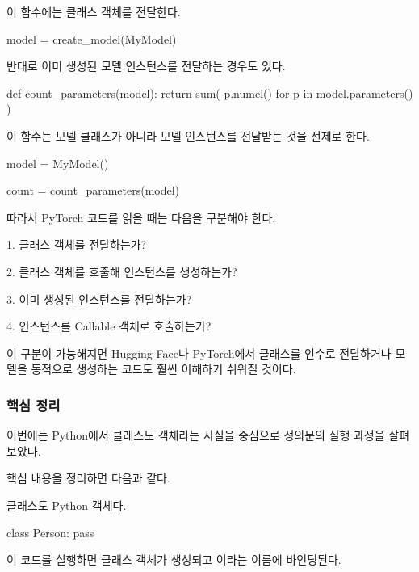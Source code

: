 이 함수에는 클래스 객체를 전달한다.

\begin{dhkcode}
model = create_model(MyModel)
\end{dhkcode}

반대로 이미 생성된 모델 인스턴스를 전달하는 경우도 있다.

\begin{dhkcode}
def count_parameters(model):
    return sum(
        p.numel()
        for p in model.parameters()
    )
\end{dhkcode}

이 함수는 모델 클래스가 아니라 모델 인스턴스를 전달받는 것을 전제로 한다.

\begin{dhkcode}
model = MyModel()

count = count_parameters(model)
\end{dhkcode}

따라서 PyTorch 코드를 읽을 때는 다음을 구분해야 한다.

\begin{dhksmry}
    1. 클래스 객체를 전달하는가?

    2. 클래스 객체를 호출해 인스턴스를 생성하는가?

    3. 이미 생성된 인스턴스를 전달하는가?

    4. 인스턴스를 Callable 객체로 호출하는가?
\end{dhksmry}

이 구분이 가능해지면 Hugging Face나 PyTorch에서 클래스를 인수로 전달하거나 모델을 동적으로 생성하는 코드도 훨씬 이해하기 쉬워질 것이다.

\subsubsection{핵심 정리}

이번에는 Python에서 클래스도 객체라는 사실을 중심으로  정의문의 실행 과정을 살펴보았다.

핵심 내용을 정리하면 다음과 같다.

\begin{dhknote}
\begin{dhksmry}[centered]
클래스도 Python 객체다.
\end{dhksmry}
\end{dhknote}

\begin{dhkcode}
class Person:
    pass
\end{dhkcode}

이 코드를 실행하면 클래스 객체가 생성되고 이라는 이름에 바인딩된다.

